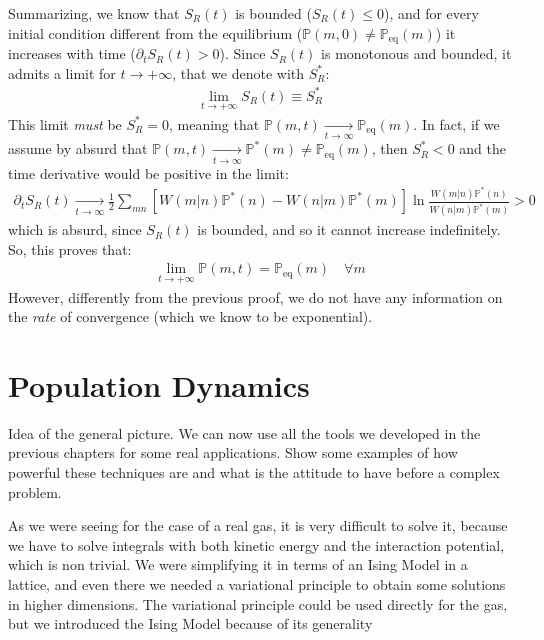 \documentclass[../../main.tex]{subfiles}
\begin{document}
Summarizing, we know that $S_R(t)$ is bounded ($S_R(t) \leq 0$), and for every initial condition different from the equilibrium ($\mathbb{P}(m,0) \neq \mathbb{P}_{\mathrm{eq}}(m)$) it increases with time ($\partial_t S_R(t) > 0$). Since $S_R(t)$ is monotonous and bounded, it admits a limit for $t \to +\infty$, that we denote with $S_R^*$:
\begin{align*}
    \lim_{t \to +\infty} S_R(t) \equiv S_R^*
\end{align*}
This limit \textit{must} be $S_R^* = 0$, meaning that $\mathbb{P}(m,t)  \xrightarrow[t \to \infty]{}  \mathbb{P}_{\mathrm{eq}}(m)$. In fact, if we assume by absurd that $\mathbb{P}(m,t)  \xrightarrow[t \to \infty]{}   \mathbb{P}^*(m) \neq \mathbb{P}_{\mathrm{eq}}(m)$, then $S_R^* < 0$ and the time derivative would be positive in the limit:
\begin{align*}
    \partial_t S_R(t)  \xrightarrow[t \to \infty]{}  \frac{1}{2} \sum_{mn} [W(m|n) \mathbb{P}^*(n) - W(n|m)\mathbb{P}^*(m)] \ln \frac{W(m|n)\mathbb{P}^*(n)}{W(n|m)\mathbb{P}^*(m)} > 0
\end{align*}
which is absurd, since $S_R(t)$ is bounded, and so it cannot increase indefinitely. So, this proves that:
\begin{align*}
    \lim_{t \to +\infty} \mathbb{P}(m,t) = \mathbb{P}_{\mathrm{eq}}(m) \quad \forall m
\end{align*}
However, differently from the previous proof, we do not have any information on the \textit{rate} of convergence (which we know to be exponential).

\chapter{Population Dynamics}%

Idea of the general picture. 
We can now use all the tools we developed in the previous chapters for some real applications. 
Show some examples of how powerful these techniques are and what is the attitude to have before a complex problem.

As we were seeing for the case of a real gas, it is very difficult to solve it, because we have to solve integrals with both kinetic energy and the interaction potential, which is non trivial. We were simplifying it in terms of an Ising Model in a lattice, and even there we needed a variational principle to obtain some solutions in higher dimensions. 
The variational principle could be used directly for the gas, but we introduced the Ising Model because of its generality
\end{document}
